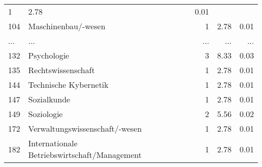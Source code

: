 \begin{longtable}{lXrrr}
          \num{1} &
          \num[round-mode=places,round-precision=2]{2,78} &
          \num[round-mode=places,round-precision=2]{0,01} \\
        104 & \multicolumn{1}{X}{Maschinenbau/-wesen} & %
          \num{1} &
          \num[round-mode=places,round-precision=2]{2,78} &
          \num[round-mode=places,round-precision=2]{0,01} \\
       ... & ... & ... & ... & ... \\
        132 & \multicolumn{1}{X}{Psychologie} & %
          \num{3} &
          \num[round-mode=places,round-precision=2]{8,33} &
          \num[round-mode=places,round-precision=2]{0,03} \\

        135 & \multicolumn{1}{X}{Rechtswissenschaft} & %
          \num{1} &
          \num[round-mode=places,round-precision=2]{2,78} &
          \num[round-mode=places,round-precision=2]{0,01} \\

        144 & \multicolumn{1}{X}{Technische Kybernetik} & %
          \num{1} &
          \num[round-mode=places,round-precision=2]{2,78} &
          \num[round-mode=places,round-precision=2]{0,01} \\

        147 & \multicolumn{1}{X}{Sozialkunde} & %
          \num{1} &
          \num[round-mode=places,round-precision=2]{2,78} &
          \num[round-mode=places,round-precision=2]{0,01} \\

        149 & \multicolumn{1}{X}{Soziologie} & %
          \num{2} &
          \num[round-mode=places,round-precision=2]{5,56} &
          \num[round-mode=places,round-precision=2]{0,02} \\

        172 & \multicolumn{1}{X}{Verwaltungswissenschaft/-wesen} & %
          \num{1} &
          \num[round-mode=places,round-precision=2]{2,78} &
          \num[round-mode=places,round-precision=2]{0,01} \\

        182 & \multicolumn{1}{X}{Internationale Betriebswirtschaft/Management} & %
          \num{1} &
          \num[round-mode=places,round-precision=2]{2,78} &
          \num[round-mode=places,round-precision=2]{0,01} \\


\end{longtable}
